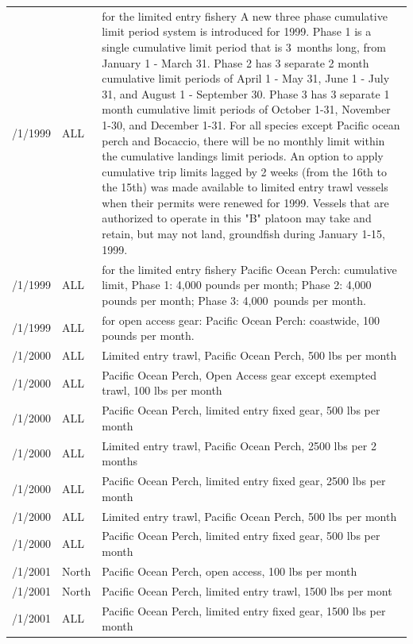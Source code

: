 \documentclass[12pt,]{article}
\begin{document}
\begin{table}[ht]
\begin{tabular}{>{\centering}p{.75in}>{\centering}p{.75in}>{\raggedright}p{4.25in}}
  1/1/1999 &  ALL  &  for the limited entry fishery  A new three phase cumulative limit period system is introduced for 1999.  Phase 1 is a single cumulative limit period that is 3 months long, from January 1 - March 31.  Phase 2 has 3 separate 2 month cumulative limit periods of April 1 -  May 31, June 1 -  July 31, and August 1 - September 30.  Phase 3 has 3 separate 1 month cumulative limit periods of October 1-31, November 1-30, and December 1-31.  For all species except Pacific ocean perch and Bocaccio, there will be no monthly limit within the cumulative landings limit periods.  An option to apply cumulative trip limits lagged by 2 weeks (from the 16th to the 15th) was made available to limited entry trawl vessels when their permits were renewed for 1999.  Vessels that are authorized to operate in this "B" platoon may take and retain, but may not land, groundfish during January 1-15, 1999. \\ 
  1/1/1999 &  ALL  &  for the limited entry fishery Pacific Ocean Perch: cumulative limit, Phase 1: 4,000 pounds per month; Phase 2: 4,000 pounds per month; Phase 3: 4,000 pounds per month. \\ 
  1/1/1999 &  ALL  &  for open access gear: Pacific Ocean Perch: coastwide, 100 pounds per month. \\ 
  1/1/2000 &  ALL  &  Limited entry trawl, Pacific Ocean Perch, 500 lbs per month \\ 
  1/1/2000 &  ALL  &  Pacific Ocean Perch, Open Access gear except exempted trawl, 100 lbs per month \\ 
  1/1/2000 &  ALL  &  Pacific Ocean Perch, limited entry fixed gear, 500 lbs per month \\ 
  5/1/2000 &  ALL  &  Limited entry trawl, Pacific Ocean Perch, 2500 lbs per 2 months \\ 
  5/1/2000 &  ALL  &  Pacific Ocean Perch, limited entry fixed gear, 2500 lbs per month \\ 
  11/1/2000 &  ALL  &  Limited entry trawl, Pacific Ocean Perch, 500 lbs per month \\ 
  11/1/2000 &  ALL  &  Pacific Ocean Perch, limited entry fixed gear, 500 lbs per month \\ 
  1/1/2001 &  3600 North  &  Pacific Ocean Perch, open access, 100 lbs per month \\ 
  1/1/2001 &  4010 North  &  Pacific Ocean Perch, limited entry trawl, 1500 lbs per mont \\ 
  1/1/2001 &  ALL  &  Pacific Ocean Perch, limited entry fixed gear,  1500 lbs per month \\ 

\end{tabular}
\end{table}
\end{document}
